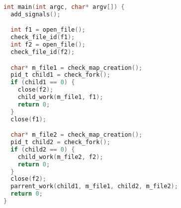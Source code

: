 \begin{lstlisting}[language=C]
int main(int argc, char* argv[]) {
  add_signals();

  int f1 = open_file();
  check_file_id(f1);
  int f2 = open_file();
  check_file_id(f2);

  char* m_file1 = check_map_creation();
  pid_t child1 = check_fork();
  if (child1 == 0) {
    close(f2);
    child_work(m_file1, f1);
    return 0;
  }
  close(f1);

  char* m_file2 = check_map_creation();
  pid_t child2 = check_fork();
  if (child2 == 0) {
    child_work(m_file2, f2);
    return 0;
  }
  close(f2);
  parrent_work(child1, m_file1, child2, m_file2);
  return 0;
}

\end{lstlisting}

\pagebreak